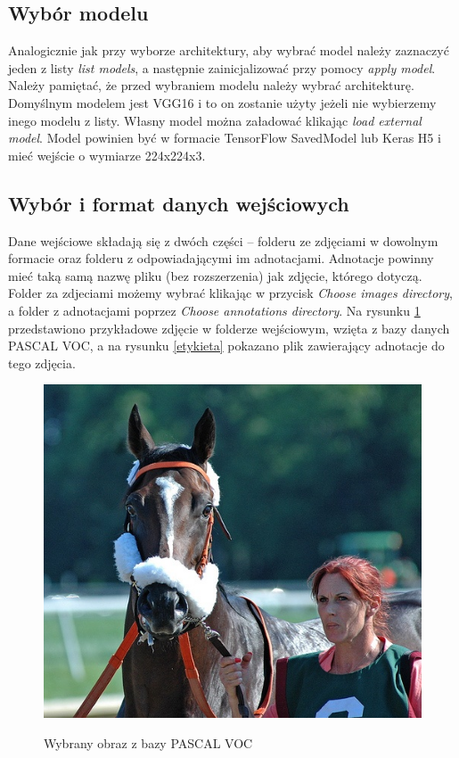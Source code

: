 \documentclass[a4paper,twoside,12pt]{book}
\begin{document}
{\subsection{Wybór modelu}
{Analogicznie jak przy wyborze architektury, aby wybrać model należy zaznaczyć jeden z listy \emph{list models}, a następnie zainicjalizować przy pomocy \emph{apply model}. Należy pamiętać, że przed wybraniem modelu należy wybrać architekturę. Domyślnym modelem jest VGG16 i to on zostanie użyty jeżeli nie wybierzemy inego modelu z listy. Własny model można załadować klikając \emph{load external model}. Model powinien być w formacie TensorFlow SavedModel lub Keras H5 i mieć wejście o wymiarze 224x224x3.}
\subsection{Wybór i format danych wejściowych}
{Dane wejściowe składają się z dwóch części – folderu ze zdjęciami w dowolnym formacie oraz folderu z odpowiadającymi im adnotacjami. Adnotacje powinny mieć taką samą nazwę pliku (bez rozszerzenia) jak zdjęcie, którego dotyczą. Folder za zdjeciami możemy wybrać klikając w przycisk \emph{Choose images directory}, a folder z adnotacjami poprzez \emph{Choose annotations directory}. 
Na rysunku \ref{example} przedstawiono przykładowe zdjęcie w folderze wejściowym, wzięta z bazy danych PASCAL VOC, a na rysunku \ref{etykieta} pokazano plik zawierający adnotacje do tego zdjęcia.}

\begin{figure}[h!]
\caption{Wybrany obraz z bazy PASCAL VOC}

\centering
\includegraphics[scale=0.4]{2007_000799.jpg}
\label{example}
\end{figure}

}
\end{document}

